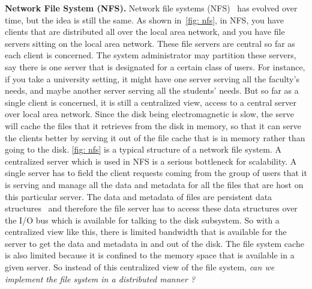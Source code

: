 \documentclass[11pt]{lecture}
\begin{document}
\noindent
{\bf Network File System (NFS).} Network file systems (NFS)~\cite{nfs} has evolved over time, 
but the idea is still the same. As shown in~\autoref{fig: nfs}, in NFS, you have clients that 
are distributed all over the local area network, and you have file servers sitting on the 
local area network. These file servers are central so far as each client is concerned. 
The system administrator may partition these servers, say there is one server that 
is designated for a certain class of users. For instance, if you take a university setting, it 
might have one server serving all the faculty's needs, and maybe another server 
serving all the students' needs. But so far as a single client is concerned, it is still a 
centralized view, access to a central server over local area network. Since the 
disk being electromagnetic is slow, the serve will cache the files that it retrieves from 
the disk in memory, so that it can serve the clients better by serving it out of the file cache that 
is in memory rather than going to the disk. \autoref{fig: nfs} is a typical structure of 
a network file system. A centralized server which is used in NFS is a serious 
bottleneck for scalability. A single server has to field the client requests coming from 
the group of users that it is serving and manage all the data and metadata for all the files 
that are host on this particular server. The data and metadata of files are persistent 
data structures~\cite{persistentds} and therefore the file server has to access these data structures over the I/O 
bus which is available for talking to the disk subsystem. So with a centralized view like this, 
there is limited bandwidth that is available for the server to get the data and metadata 
in and out of the disk. The file system cache is also limited because it is confined to 
the memory space that is available in a given server. So instead of this centralized view of 
the file system, {\it can we implement the file system in a distributed manner ?}
\end{document}
